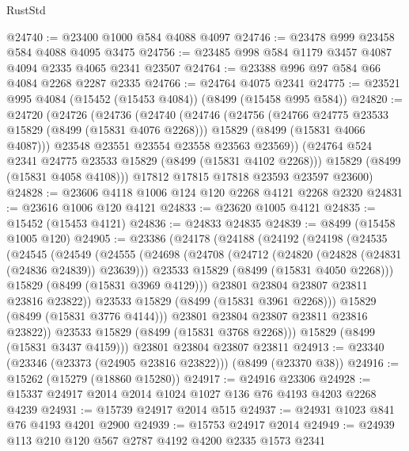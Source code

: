 \begin{lexlean}{RustStd}
\begin{coremodule}
@24740 := @23400 @1000 @584 @4088 @4097
@24746 := @23478 @999 @23458 @584 @4088 @4095 @3475
@24756 := @23485 @998 @584 @1179 @3457 @4087 @4094 @2335 @4065 @2341 @23507
@24764 := @23388 @996 @97 @584 @66 @4084 @2268 @2287 @2335
@24766 := @24764 @4075 @2341
@24775 := @23521 @995 @4084 (@15452 (@15453 @4084)) (@8499 (@15458 @995 @584))
@24820 := @24720
    (@24726
      (@24736
        (@24740
          (@24746
            (@24756
              (@24766 @24775 @23533 @15829 (@8499 (@15831 @4076 @2268)))
              @15829
              (@8499 (@15831 @4066 @4087)))
            @23548
            @23551
            @23554
            @23558
            @23563
            @23569))
        (@24764 @524 @2341 @24775 @23533 @15829 (@8499 (@15831 @4102 @2268)))
        @15829
        (@8499 (@15831 @4058 @4108)))
      @17812
      @17815
      @17818
      @23593
      @23597
      @23600)
@24828 := @23606 @4118 @1006 @124 @120 @2268 @4121 @2268 @2320
@24831 := @23616 @1006 @120 @4121
@24833 := @23620 @1005 @4121
@24835 := @15452 (@15453 @4121)
@24836 := @24833 @24835
@24839 := @8499 (@15458 @1005 @120)
@24905 := @23386
    (@24178
      (@24188
        (@24192
          (@24198
            (@24535
              (@24545
                (@24549
                  (@24555
                    (@24698
                      (@24708
                        (@24712 (@24820 (@24828 (@24831 (@24836 @24839)) @23639)))
                        @23533
                        @15829
                        (@8499 (@15831 @4050 @2268)))
                      @15829
                      (@8499 (@15831 @3969 @4129)))
                    @23801
                    @23804
                    @23807
                    @23811
                    @23816
                    @23822))
                @23533
                @15829
                (@8499 (@15831 @3961 @2268)))
              @15829
              (@8499 (@15831 @3776 @4144)))
            @23801
            @23804
            @23807
            @23811
            @23816
            @23822))
        @23533
        @15829
        (@8499 (@15831 @3768 @2268)))
      @15829
      (@8499 (@15831 @3437 @4159)))
    @23801
    @23804
    @23807
    @23811
@24913 := @23340 (@23346 (@23373 (@24905 @23816 @23822))) (@8499 (@23370 @38))
@24916 := @15262 (@15279 (@18860 @15280))
@24917 := @24916 @23306
@24928 := @15337 @24917 @2014 @2014 @1024 @1027 @136 @76 @4193 @4203 @2268 @4239
@24931 := @15739 @24917 @2014 @515
@24937 := @24931 @1023 @841 @76 @4193 @4201 @2900
@24939 := @15753 @24917 @2014
@24949 := @24939 @113 @210 @120 @567 @2787 @4192 @4200 @2335 @1573 @2341

\end{coremodule}
\end{lexlean}
